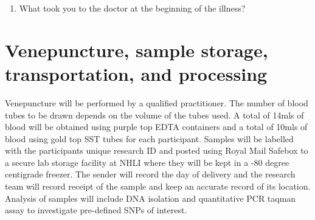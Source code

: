 \documentclass[a4paper,10pt]{article}
\begin{document}
\begin{enumerate}
\item What took you to the doctor at the beginning of the illness? 
\end{enumerate}

\section{Venepuncture, sample storage, transportation, and processing} 

Venepuncture will be performed by a qualified practitioner. The number of blood tubes to be drawn depends on the volume of the tubes used. A total of 14mls of blood will be obtained using purple top EDTA containers and a total of 10mls of blood using gold top SST tubes for each participant. Samples will be labelled with the participants unique research ID and posted using Royal Mail Safebox to a secure lab storage facility at NHLI where they will be kept in a -80 degree centigrade freezer.
The sender will record the day of delivery and the research team will record receipt of the sample and keep an accurate record of its location. Analysis of samples will include DNA isolation and quantitative PCR taqman assay to investigate pre-defined SNPs of interest.
\end{document}
